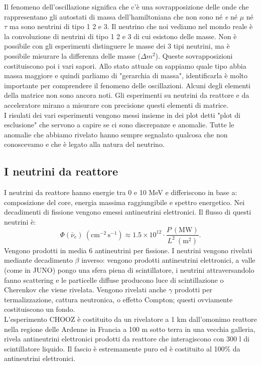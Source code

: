 \documentclass[11pt, oneside]{article}   	%
\begin{document}
\noindent Il fenomeno dell'oscillazione significa che c'è una sovrapposizione delle onde che rappresentano gli autostati di massa dell'hamiltoniana che non sono né \textit{e} né $\mu$ né $\tau$ ma sono neutrini di tipo 1 2 e 3. Il neutrino che noi vediamo nel mondo reale è la convoluzione di neutrini di tipo 1 2 e 3 di cui esistono delle masse. Non è possibile con gli esperimenti distinguere le masse dei 3 tipi neutrini, ma è possibile misurare la differenza delle masse ($\Delta m^2$). Queste sovrapposizioni costituiscono poi i vari sapori. Allo stato attuale on sappiamo quale tipo abbia massa maggiore e quindi parliamo di "gerarchia di massa", identificarla è molto importante per comprendere il fenomeno delle oscillazioni. Alcuni degli elementi della matrice non sono ancora noti. Gli esperimenti su neutrini da reattore e da acceleratore mirano a misurare con precisione questi elementi di matrice. \\

I risulati dei vari esperimenti vengono messi insieme in dei plot detti "plot di esclusione" che servono a capire se ci sono discrepanze e anomalie. Tutte le anomalie che abbiamo rivelato hanno sempre segnalato qualcosa che non conoscevamo e che è legato alla natura del neutrino. \\

\subsection{I neutrini da reattore}
I neutrini da reattore hanno energie tra 0 e 10 MeV e differiscono in base a: composizione del core, energia massima raggiungibile e spettro energetico. Nei decadimenti di fissione vengono emessi antineutrini elettronici. Il flusso di questi neutrini è: \[ \Phi(\bar{\nu}_e)\ (\text{cm}^{-2}\,\text{s}^{-1}) \approx 1.5 \times 10^{12} \cdot \frac{P\ (\text{MW})}{L^2\ (\text{m}^2)}.\] 
Vengono prodotti in media 6 antineutrini per fissione. I neutrini vengono rivelati mediante decadimento $\beta$ inverso: vengono prodotti antineutrini elettronici, a valle (come in JUNO) pongo una sfera piena di scintillatore, i neutrini attraversandolo fanno scattering e le particelle diffuse producono luce di scintillazione o Cherenkov che viene rivelata. Vengono rivelati anche $\gamma$ prodotti per termalizzazione, cattura neutronica, o effetto Compton; questi ovviamente costituiscono un fondo. \\
L'esperimento CHOOZ è costituito da un rivelatore a 1 km dall’omonimo reattore nella regione delle Ardenne in Francia a 100 m sotto terra in una vecchia galleria, rivela antineutrini elettronici prodotti da reattore che interagiscono con 300 l di scintillatore liquido. Il fascio è estremamente puro ed è costituito al 100\% da antineutrini elettronici. \\
\end{document}
